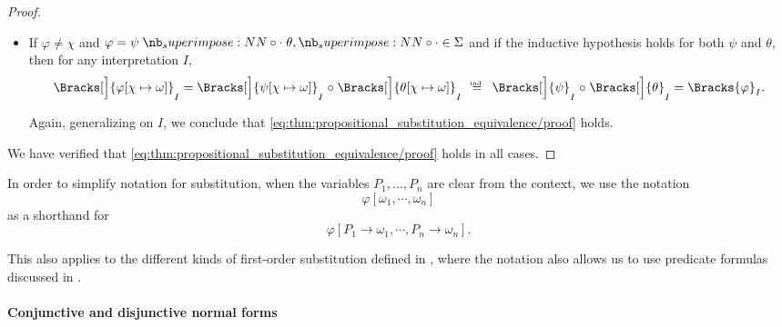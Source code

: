 \begin{proof}
\begin{itemize}
    \item If \( \varphi \neq \chi \) and \( \varphi = \psi \syncirc \theta, {\syncirc} \in \Sigma \) and if the inductive hypothesis holds for both \( \psi \) and \( \theta \), then for any interpretation \( I \),
    \begin{equation*}
      \Bracks[\Big]{ \varphi[\chi \mapsto \omega] }_I
      =
      \Bracks[\Big]{ \psi[\chi \mapsto \omega] }_I \relcirc \Bracks[\Big]{ \theta[\chi \mapsto \omega] }_I
      \reloset {\T{ind.}} =
      \Bracks[\Big]{\psi}_I \relcirc \Bracks[\Big]{\theta}_I
      =
      \Bracks{\varphi}_I.
    \end{equation*}

    Again, generalizing on \( I \), we conclude that \eqref{eq:thm:propositional_substitution_equivalence/proof} holds.
  \end{itemize}

  We have verified that \eqref{eq:thm:propositional_substitution_equivalence/proof} holds in all cases.
\end{proof}

\begin{remark}\label{rem:substitution_shorthand_notation}
  In order to simplify notation for substitution, when the variables \( P_1, \ldots, P_n \) are clear from the context, we use the notation
  \begin{equation*}
    \varphi[\omega_1, \cdots, \omega_n]
  \end{equation*}
  as a shorthand for
  \begin{equation*}
    \varphi[P_1 \to \omega_1, \cdots, P_n \to \omega_n].
  \end{equation*}

  This also applies to the different kinds of first-order substitution defined in , where the notation also allows us to use predicate formulas discussed in .
\end{remark}

\paragraph{Conjunctive and disjunctive normal forms}

